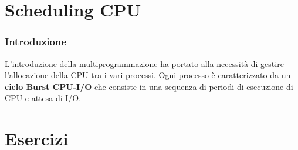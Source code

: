 \documentclass{article}
\begin{document}
\part{Scheduling CPU} %
\section{Introduzione}
L'introduzione della multiprogrammazione ha portato alla necessità di gestire l'allocazione della CPU tra i vari processi.
Ogni processo è caratterizzato da un \textbf{ciclo Burst CPU-I/O} che consiste in una sequenza di periodi
di esecuzione di CPU e attesa di I/O.



\part{Esercizi}
\end{document}
